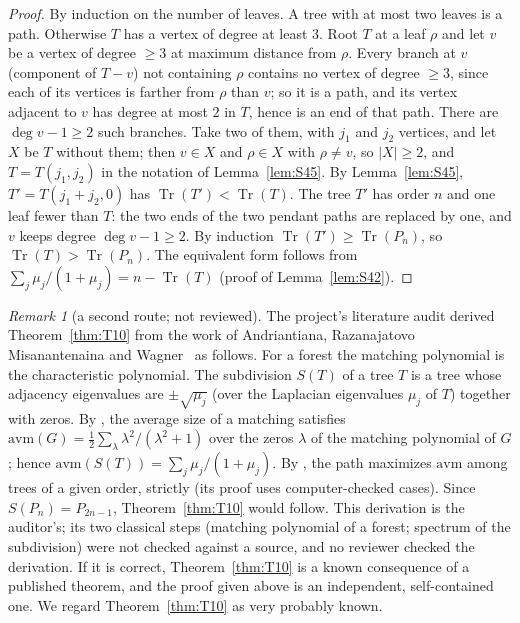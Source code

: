 \documentclass[11pt]{amsart}
\theoremstyle{definition}
\theoremstyle{remark}
\newtheorem{remark}[theorem]{Remark}
\newcommand{\Tr}{\operatorname{Tr}}
\begin{document}
\begin{proof}
By induction on the number of leaves. A tree with at most two leaves is a
path. Otherwise $T$ has a vertex of degree at least $3$. Root $T$ at a leaf
$\rho$ and let $v$ be a vertex of degree $\ge3$ at maximum distance from
$\rho$. Every branch at $v$ (component of $T-v$) not containing $\rho$
contains no vertex of degree $\ge3$, since each of its vertices is farther
from $\rho$ than $v$; so it is a path, and its vertex adjacent to $v$ has
degree at most $2$ in $T$, hence is an end of that path. There are
$\deg v-1\ge2$ such branches. Take two of them, with $j_1$ and $j_2$
vertices, and let $X$ be $T$ without them; then $v\in X$ and $\rho\in X$
with $\rho\ne v$, so $|X|\ge2$, and $T=T(j_1,j_2)$ in the notation of
Lemma~\ref{lem:S45}. By Lemma~\ref{lem:S45}, $T'=T(j_1+j_2,0)$ has
$\Tr(T')<\Tr(T)$. The tree $T'$ has order $n$ and one leaf fewer than $T$:
the two ends of the two pendant paths are replaced by one, and $v$ keeps
degree $\deg v-1\ge2$. By induction $\Tr(T')\ge\Tr(P_n)$, so
$\Tr(T)>\Tr(P_n)$. The equivalent form follows from
$\sum_j\mu_j/(1+\mu_j)=n-\Tr(T)$ (proof of Lemma~\ref{lem:S42}).
\end{proof}

\begin{remark}[a second route; not reviewed]\label{rem:AMW}
The project's literature audit derived Theorem~\ref{thm:T10} from the work
of Andriantiana, Razanajatovo Misanantenaina and Wagner~\cite{AMW} as
follows. For a forest the matching polynomial is the characteristic
polynomial. The subdivision $S(T)$ of a tree $T$ is a tree whose adjacency
eigenvalues are $\pm\sqrt{\mu_j}$ (over the Laplacian eigenvalues $\mu_j$ of
$T$) together with zeros. By \cite[Lemma~5.1]{AMW}, the average size of a
matching satisfies $\mathrm{avm}(G)=\frac12\sum_\lambda\lambda^2/(\lambda^2+1)$
over the zeros $\lambda$ of the matching polynomial of $G$; hence
$\mathrm{avm}(S(T))=\sum_j\mu_j/(1+\mu_j)$. By \cite[Theorem~4.4]{AMW}, the
path maximizes $\mathrm{avm}$ among trees of a given order, strictly (its
proof uses computer-checked cases). Since $S(P_n)=P_{2n-1}$,
Theorem~\ref{thm:T10} would follow. This derivation is the auditor's; its two
classical steps (matching polynomial of a forest; spectrum of the
subdivision) were not checked against a source, and no reviewer checked the
derivation. If it is correct, Theorem~\ref{thm:T10} is a known consequence
of a published theorem, and the proof given above is an independent,
self-contained one. We regard Theorem~\ref{thm:T10} as very probably known.
\end{remark}
\end{document}

